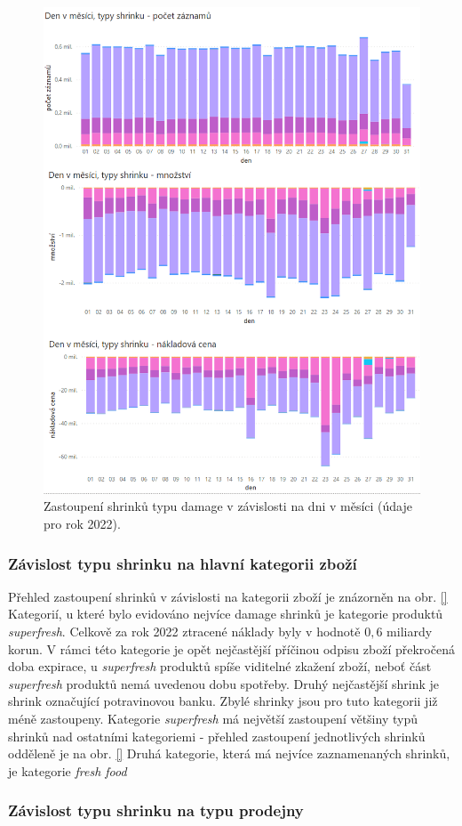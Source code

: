 \begin{figure}[hbtp!]
    \centering
    \includegraphics[width=\textwidth]{obrazky/grafy/Grad_dny_mesic-D.png}
    \caption{Zastoupení shrinků typu damage v závislosti na dni v měsíci (údaje pro rok 2022).}
    \label{obr:rok:g:mesicD}
\end{figure}

\subsubsection*{Závislost typu shrinku na hlavní kategorii zboží}

Přehled zastoupení shrinků v závislosti na kategorii zboží je znázorněn na obr. \ref{} %
Kategorií, u které bylo evidováno nejvíce damage shrinků je kategorie produktů \emph{superfresh}. Celkově za rok 2022 ztracené náklady byly v hodnotě $0{,}6$ miliardy korun.
V rámci této kategorie je opět nejčastější příčinou odpisu zboží překročená doba expirace, u \emph{superfresh} produktů spíše viditelné zkažení zboží, neboť část \emph{superfresh} produktů nemá uvedenou dobu spotřeby. Druhý nejčastější shrink je shrink označující potravinovou banku. Zbylé shrinky jsou pro tuto kategorii již méně zastoupeny. 
Kategorie \emph{superfresh} má největší zastoupení většiny typů shrinků nad ostatními kategoriemi - přehled zastoupení jednotlivých shrinků odděleně je na obr. \ref{} %
Druhá kategorie, která má nejvíce zaznamenaných shrinků, je kategorie \emph{fresh food} 



\subsubsection*{Závislost typu shrinku na typu prodejny}


